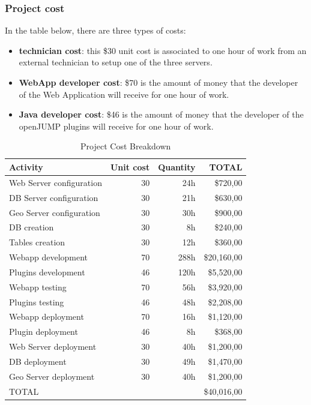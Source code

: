 \subsubsection{Project cost}
In the table below, there are three types of costs:
\begin{itemize}
    \item \textbf{technician cost}: this \$30  unit cost is associated to one hour of work from an external technician to setup one of the three servers.
    \item \textbf{WebApp developer cost}: \$70 is the amount of money that the developer of the Web Application will receive for one hour of work.
    \item \textbf{Java developer cost}: \$46 is the amount of money that the developer of the openJUMP plugins will receive for one hour of work. 
\end{itemize}

\begin{table}[htbp]
    \centering
    \caption{Project Cost Breakdown} 
    \begin{tabular}{lrrr}
        \toprule
        Activity & Unit cost & Quantity & TOTAL \\
        \midrule
        Web Server configuration & 30 & 24h & \$720,00 \\
        DB Server configuration & 30 & 21h & \$630,00 \\
        Geo Server configuration & 30 & 30h & \$900,00 \\
        DB creation & 30 & 8h & \$240,00 \\
        Tables creation & 30 & 12h & \$360,00 \\
        Webapp development & 70 & 288h & \$20,160,00 \\
        Plugins development & 46 & 120h & \$5,520,00 \\
        Webapp testing & 70 & 56h & \$3,920,00 \\
        Plugins testing & 46 & 48h & \$2,208,00 \\
        Webapp deployment & 70 & 16h & \$1,120,00 \\
        Plugin deployment & 46 & 8h & \$368,00 \\
        Web Server deployment & 30 & 40h & \$1,200,00 \\
        DB deployment & 30 & 49h & \$1,470,00 \\
        Geo Server deployment & 30 & 40h & \$1,200,00 \\
        \midrule
        TOTAL & & & \$40,016,00 \\
        \bottomrule
    \end{tabular}
\end{table}

